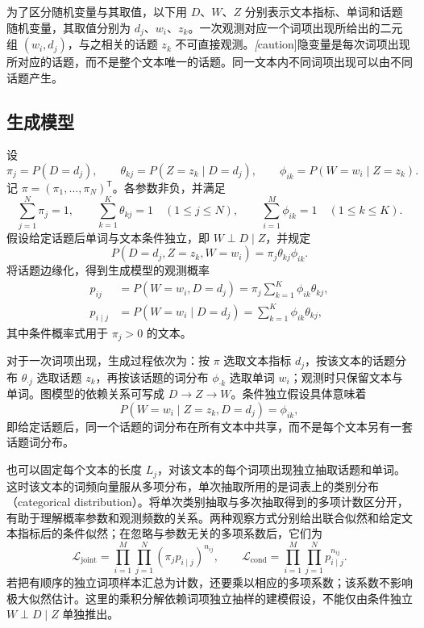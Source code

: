 为了区分随机变量与其取值，以下用 $D$、$W$、$Z$ 分别表示文本指标、单词和话题随机变量，其取值分别为 $d_j$、$w_i$、$z_k$。一次观测对应一个词项出现所给出的二元组 $(w_i,d_j)$，与之相关的话题 $z_k$ 不可直接观测。\emph[caution]{隐变量是每次词项出现所对应的话题，而不是整个文本唯一的话题。}同一文本内不同词项出现可以由不同话题产生。

\subsection{生成模型}
\label{subsec:lh-plsa-generative}

\begin{definition}[概率潜在语义分析的生成模型]
\label{def:lh-plsa-generative}
设
\[
\pi_j=P(D=d_j),\qquad
\theta_{kj}=P(Z=z_k\mid D=d_j),\qquad
\phi_{ik}=P(W=w_i\mid Z=z_k).
\]
记 $\pi=(\pi_1,\ldots,\pi_N)^{\mathsf T}$。各参数非负，并满足
\begin{equation}
\sum_{j=1}^N\pi_j=1,\qquad
\sum_{k=1}^K\theta_{kj}=1\quad(1\leq j\leq N),\qquad
\sum_{i=1}^M\phi_{ik}=1\quad(1\leq k\leq K).
\label{eq:lh-plsa-normalization}
\end{equation}
假设给定话题后单词与文本条件独立，即 $W\perp D\mid Z$，并规定
\begin{equation}
P(D=d_j,Z=z_k,W=w_i)=\pi_j\theta_{kj}\phi_{ik}.
\label{eq:lh-plsa-complete-joint}
\end{equation}
将话题边缘化，得到生成模型的观测概率
\begin{equation}
\begin{aligned}
p_{ij}&=P(W=w_i,D=d_j)
=\pi_j\sum_{k=1}^K\phi_{ik}\theta_{kj},\\
p_{i\mid j}&=P(W=w_i\mid D=d_j)
=\sum_{k=1}^K\phi_{ik}\theta_{kj},
\end{aligned}
\label{eq:lh-plsa-generative}
\end{equation}
其中条件概率式用于 $\pi_j>0$ 的文本。
\end{definition}

对于一次词项出现，生成过程依次为：按 $\pi$ 选取文本指标 $d_j$，按该文本的话题分布 $\theta_{\cdot j}$ 选取话题 $z_k$，再按该话题的词分布 $\phi_{\cdot k}$ 选取单词 $w_i$；观测时只保留文本与单词。图模型的依赖关系可写成 $D\to Z\to W$。条件独立假设具体意味着
\[
P(W=w_i\mid Z=z_k,D=d_j)=\phi_{ik},
\]
即给定话题后，同一个话题的词分布在所有文本中共享，而不是每个文本另有一套话题词分布。

也可以固定每个文本的长度 $L_j$，对该文本的每个词项出现独立抽取话题和单词。这时该文本的词频向量服从多项分布，单次抽取所用的是词表上的类别分布（categorical distribution）。将单次类别抽取与多次抽取得到的多项计数区分开，有助于理解概率参数和观测频数的关系。两种观察方式分别给出联合似然和给定文本指标后的条件似然；在忽略与参数无关的多项系数后，它们为
\begin{equation}
\mathcal L_{\mathrm{joint}}=\prod_{i=1}^M\prod_{j=1}^N
\left(\pi_j p_{i\mid j}\right)^{n_{ij}},\qquad
\mathcal L_{\mathrm{cond}}=\prod_{i=1}^M\prod_{j=1}^N
p_{i\mid j}^{n_{ij}}.
\label{eq:lh-plsa-likelihoods}
\end{equation}
若把有顺序的独立词项样本汇总为计数，还要乘以相应的多项系数；该系数不影响极大似然估计。这里的乘积分解依赖词项独立抽样的建模假设，不能仅由条件独立 $W\perp D\mid Z$ 单独推出。

